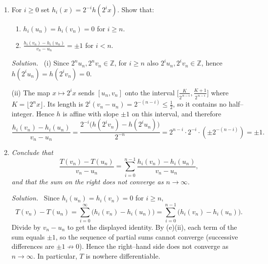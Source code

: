 \documentclass[11pt,a4paper]{article}
\newenvironment{solution}{\par\noindent\textit{Solution.}\ }{\par\vspace{0.5em}}
\begin{document}
\begin{enumerate}
\item For $i\ge 0$ set $h_i(x)=2^{-i}h(2^i x)$. Show that:
\begin{enumerate}
\renewcommand\labelenumii{(\roman{enumii})}
\item $h_i(u_n)=h_i(v_n)=0$ for $i\ge n$.
\item $\displaystyle \frac{h_i(v_n)-h_i(u_n)}{v_n-u_n}=\pm 1$ for $i<n$.
\end{enumerate}
\begin{solution}
(i) Since $2^n u_n,2^n v_n\in\mathbb{Z}$, for $i\ge n$ also $2^i u_n,2^i v_n\in\mathbb{Z}$, hence $h(2^i u_n)=h(2^i v_n)=0$.

(ii) The map $x\mapsto 2^i x$ sends $[u_n,v_n]$ onto the interval
$\big[\tfrac{K}{2^{\,n-i}},\tfrac{K+1}{2^{\,n-i}}\big]$ where $K= \lfloor 2^n x\rfloor$.
Its length is $2^{i}(v_n-u_n)=2^{-(n-i)}\le \tfrac12$, so it contains no half--integer.
Hence $h$ is affine with slope $\pm1$ on this interval, and therefore
\[
\frac{h_i(v_n)-h_i(u_n)}{v_n-u_n}=\frac{2^{-i}\big(h(2^i v_n)-h(2^i u_n)\big)}{2^{-n}}
=2^{n-i}\cdot 2^{-i}\cdot (\pm 2^{-(n-i)})=\pm 1.
\]
\end{solution}

\item \textit{Conclude that}
\[
\frac{T(v_n)-T(u_n)}{v_n-u_n}=\sum_{i=0}^{n-1}\frac{h_i(v_n)-h_i(u_n)}{v_n-u_n},
\]
\textit{and that the sum on the right does not converge as $n\to\infty$.}
\begin{solution}
Since $h_i(u_n)=h_i(v_n)=0$ for $i\ge n$,
\[
T(v_n)-T(u_n)=\sum_{i=0}^{\infty}\big(h_i(v_n)-h_i(u_n)\big)
=\sum_{i=0}^{n-1}\big(h_i(v_n)-h_i(u_n)\big).
\]
Divide by $v_n-u_n$ to get the displayed identity. By (e)(ii), each term of the sum equals $\pm1$, so the
sequence of partial sums cannot converge (successive differences are $\pm1\not\to 0$). Hence the right--hand side
does not converge as $n\to\infty$. In particular, $T$ is nowhere differentiable.
\end{solution}
\end{enumerate}
\end{document}
